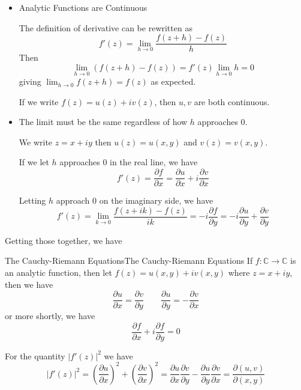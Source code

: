 \documentclass[../main.tex]{subfiles}
\begin{document}
\begin{itemize}
\item Analytic Functions are Continuous

The definition of derivative can be rewritten as 
\begin{equation*}
f'(z) = \lim_{h \to 0} \frac{f(z+h)-f(z)}{h}
\end{equation*}
Then 
\begin{equation*}
\lim_{h \to 0} (f(z+h)-f(z)) = f'(z) \lim_{h \to 0} h = 0
\end{equation*}
giving $\displaystyle \lim_{h \to 0} f(z+h) = f(z)$ as expected.

If we write $f(z) = u(z)+iv(z)$, then $u,v$ are both continuous.

\item The limit must be the same regardless of how $h$ approaches $0$.

We write $z=x+iy$ then $u(z) = u(x,y)$ and $v(z) = v(x,y)$. 

If we let  $h$ approaches $0$ in the real line, we have
\begin{equation*}
f'(z) = \frac{\partial f}{\partial x} = \frac{\partial u}{\partial x} + i \frac{\partial v}{\partial x}
\end{equation*}

Letting $h$ approach $0$ on the imaginary side, we have
\begin{equation*}
f'(z) = \lim_{k \to 0} \frac{f(z+ik)-f(z)}{ik} = -i \frac{\partial f}{\partial y} = -i \frac{\partial u}{\partial y} + \frac{\partial v}{\partial y}
\end{equation*}
\end{itemize}

Getting those together, we have
\begin{theorem}{The Cauchy-Riemann Equations}{The Cauchy-Riemann Equations}
If $f: \mathbb{C}\rightarrow \mathbb{C}$ is an analytic function, then let $f(z) = u(x,y) + iv(x,y)$ where $z = x+iy$, then we have
\begin{equation}
\displaystyle \frac{\partial u}{\partial x} = \frac{\partial v}{\partial y} \qquad
\frac{\partial u}{\partial y} = - \frac{\partial v}{\partial x}
\end{equation}
or more shortly, we have
\begin{equation}
\frac{\partial f}{\partial x}+i \frac{\partial f}{\partial y}=0
\end{equation}
\end{theorem}

For the quantity $\left|f'(z)\right|^2$ we have
\begin{equation*}
\left|f'(z)\right|^2 = \left(\frac{\partial u}{\partial x}\right)^2 + \left(\frac{\partial v}{\partial x}\right)^2 = \frac{\partial u}{\partial x}\frac{\partial v}{\partial y} - \frac{\partial u}{\partial y}\frac{\partial v}{\partial x} = \frac{\partial (u,v)}{\partial (x,y)}
\end{equation*}
\end{document}
